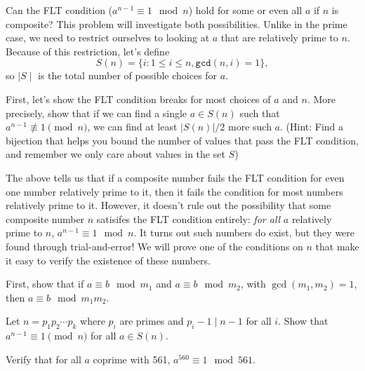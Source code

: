 Can the FLT condition ($a^{n-1} \equiv 1 \mod n$) hold for some or even all $a$ if $n$ is composite? This problem will investigate both possibilities. Unlike in the prime case, we need to restrict ourselves to looking at $a$ that are relatively prime to $n$. Because of this restriction, let's define $$S(n) =  \{i: 1 \leq i \leq n, \texttt{gcd}(n,i) = 1\},$$ so $\mid S \mid$ is the total number of possible choices for $a$.
\begin{Parts}
    \Part First, let's show the FLT condition breaks for most choices of $a$ and $n$. More precisely, show that if we can find a single $a \in S(n)$ such that $a^{n-1} \not \equiv 1 \pmod{n}$, we can find at least $|S(n)|/2$ more such $a$. (Hint: Find a bijection that helps you bound the number of values that pass the FLT condition, and remember we only care about values in the set $S$)

\end{Parts}
The above tells us that if a composite number fails the FLT condition for even one number relatively prime to it, then it fails the condition for most numbers relatively prime to it. However, it doesn't rule out the possibility that some composite number $n$ satisifes the FLT condition entirely: \emph{for all} $a$ relatively prime to $n$, $a^{n-1}\equiv 1 \mod n$. It turns out such numbers do exist, but they were found through trial-and-error! We will prove one of the conditions on $n$ that make it easy to verify the existence of these numbers.
\begin{ResumeParts}
    \Part First, show that if $a \equiv b \mod m_1$ and $a \equiv b \mod m_2$, with $\gcd(m_1, m_2)=1$, then $a \equiv b \mod m_1 m_2$.
    
    \Part Let $n = p_1 p_2 \cdots p_k$ where $p_i$ are primes and $p_i - 1 \mid n - 1$ for all $i$. Show that $a^{n-1} \equiv 1 \pmod{n}$ for all $a \in S(n)$.

    \Part Verify that for all $a$ coprime with 561, $a^{560} \equiv 1 \mod 561$.
\end{ResumeParts}


